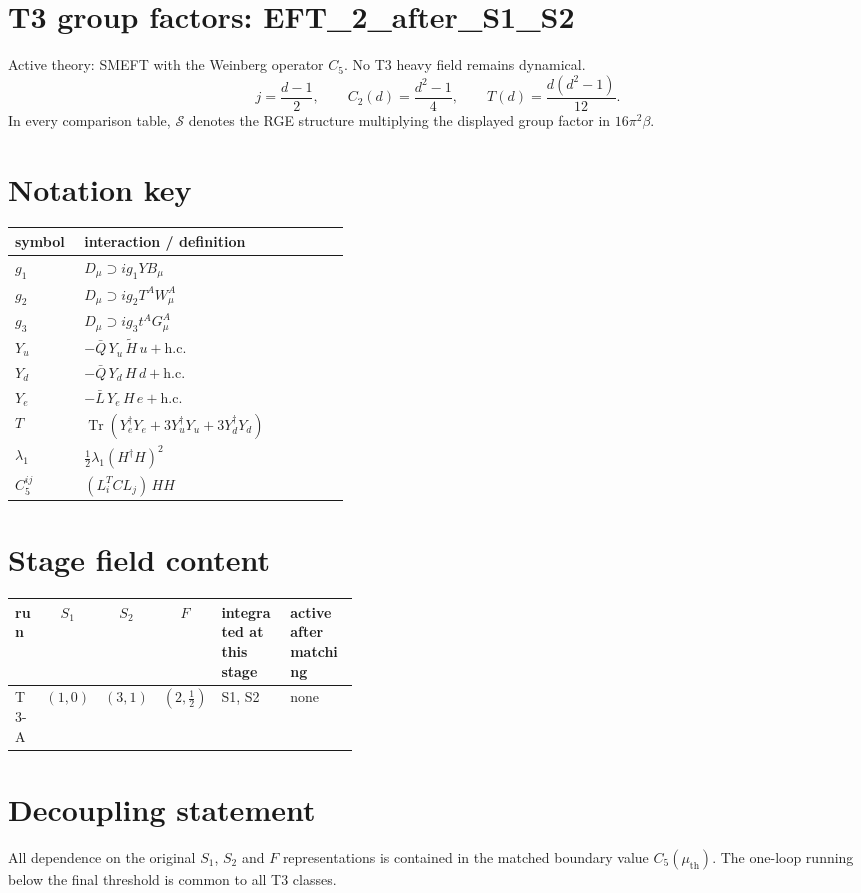 \documentclass[9pt]{article}
\begin{document}
\section*{T3 group factors: EFT\_2\_after\_S1\_S2}
Active theory: SMEFT with the Weinberg operator $C_5$.  No T3 heavy field remains dynamical.
\[j=\frac{d-1}{2},\qquad C_2(d)=\frac{d^2-1}{4},\qquad T(d)=\frac{d(d^2-1)}{12}.\]
In every comparison table, $\mathcal{S}$ denotes the RGE structure multiplying the displayed group factor in $16\pi^2\beta$.
\section*{Notation key}
\begin{longtable}{@{}p{0.19\linewidth}p{0.73\linewidth}@{}}
\toprule
symbol & interaction / definition \\
\midrule
$g_1$ & $D_\mu\supset i g_1 Y B_\mu$ \\
$g_2$ & $D_\mu\supset i g_2 T^A W_\mu^A$ \\
$g_3$ & $D_\mu\supset i g_3 t^A G_\mu^A$ \\
$Y_u$ & $-\bar Q\,Y_u\,\widetilde H\,u+\mathrm{h.c.}$ \\
$Y_d$ & $-\bar Q\,Y_d\,H\,d+\mathrm{h.c.}$ \\
$Y_e$ & $-\bar L\,Y_e\,H\,e+\mathrm{h.c.}$ \\
$T$ & $\operatorname{Tr}\!\left(Y_e^\dagger Y_e+3Y_u^\dagger Y_u+3Y_d^\dagger Y_d\right)$ \\
$\lambda_1$ & $\frac12\lambda_1(H^\dagger H)^2$ \\
$C_5^{ij}$ & $(L_i^T C L_j)\,H H$ \\
\bottomrule
\end{longtable}
\section*{Stage field content}
\begin{longtable}{@{}lccc p{0.20\linewidth}p{0.20\linewidth}@{}}
\toprule
run & $S_1$ & $S_2$ & $F$ & integrated at this stage & active after matching \\
\midrule
T3-A & $(1,0)$ & $(3,1)$ & $(2,\frac{1}{2})$ & S1, S2 & none \\
\bottomrule
\end{longtable}
\section*{Decoupling statement}
All dependence on the original $S_1$, $S_2$ and $F$ representations is contained in the matched boundary value $C_5(\mu_{\mathrm{th}})$.  The one-loop running below the final threshold is common to all T3 classes.
\end{document}
